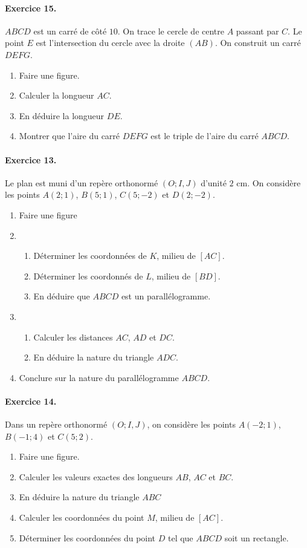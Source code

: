 \documentclass[11pt]{article}
\begin{document}
\paragraph{Exercice 15.} $ABCD$ est un carré de côté $10$. On trace le cercle de
centre $A$ passant par $C$. Le point $E$ est l'intersection du cercle avec la
droite $(AB)$. On construit un carré $DEFG$.
\begin{enumerate}
  \item Faire une figure.
  \item Calculer la longueur $AC$.
  \item En déduire la longueur $DE$.
  \item Montrer que l'aire du carré $DEFG$ est le triple de l'aire du carré
    $ABCD$.
\end{enumerate}
\vspace{2cm}
\paragraph{Exercice 13.} Le plan est muni d'un repère orthonormé $(O; I, J)$
d'unité $2$ cm. On considère les points $A(2; 1)$, $B(5; 1)$, $C(5; -2)$ et
$D(2; -2)$.
\begin{enumerate}
  \item Faire une figure
  \item \begin{enumerate}
      \item Déterminer les coordonnées de $K$, milieu de $\left[ AC
        \right]$.
      \item Déterminer les coordonnés de $L$, milieu de $\left[ BD \right]$.
      \item En déduire que $ABCD$ est un parallélogramme.
    \end{enumerate}
  \item \begin{enumerate}
      \item Calculer les distances $AC$, $AD$ et $DC$.
      \item En déduire la nature du triangle $ADC$.
    \end{enumerate}
  \item Conclure sur la nature du parallélogramme $ABCD$.
\end{enumerate}

\paragraph{Exercice 14.} Dans un repère orthonormé $(O; I, J)$, on considère les
points $A(-2;1)$, $B(-1; 4)$ et $C(5;2)$.
\begin{enumerate}
  \item Faire une figure.
  \item Calculer les valeurs exactes des longueurs $AB$, $AC$ et $BC$.
  \item En déduire la nature du triangle $ABC$
  \item Calculer les coordonnées du point $M$, milieu de $\left[ AC
    \right]$.
  \item Déterminer les coordonnées du point $D$ tel que $ABCD$ soit un
    rectangle.
\end{enumerate}
\end{document}

